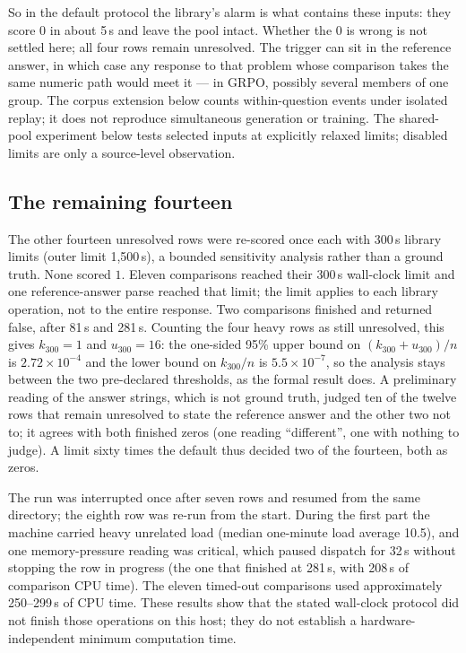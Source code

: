\documentclass[10pt,a4paper]{article}
\begin{document}
So in the default protocol the library's alarm is what contains these
inputs: they score $0$ in about 5\,s and leave the pool intact. Whether the
0 is wrong is not settled here; all four rows remain unresolved. The trigger can sit in the reference answer, in which case any
response to that problem whose comparison takes the same numeric path would
meet it --- in GRPO, possibly several members of one group. The corpus
extension below counts within-question events under isolated replay; it does
not reproduce simultaneous generation or training. The shared-pool experiment
below tests selected inputs at explicitly relaxed limits; disabled limits
are only a source-level observation.

\subsection{The remaining fourteen}
The other fourteen unresolved rows were re-scored once each with 300\,s
library limits (outer limit 1,500\,s), a bounded sensitivity analysis rather
than a ground truth. None scored $1$. Eleven comparisons reached their
300\,s wall-clock limit and one reference-answer parse reached that limit;
the limit applies to each library operation, not to the entire response.
Two comparisons
finished and returned false, after 81\,s and 281\,s. Counting the four heavy
rows as still unresolved, this gives $k_{300}=1$ and $u_{300}=16$: the one-sided
95\% upper bound on $(k_{300}+u_{300})/n$ is $2.72\times10^{-4}$ and the
lower bound on $k_{300}/n$ is $5.5\times10^{-7}$, so the analysis stays between
the two pre-declared thresholds, as the formal result does. A preliminary
reading of the answer strings, which is not ground truth, judged ten of the twelve rows that
remain unresolved to state the reference answer and the other two not to; it
agrees with both finished zeros (one reading ``different'', one with nothing
to judge). A limit sixty times the default thus decided two of the fourteen,
both as zeros.

The run was interrupted once after seven rows and resumed
from the same directory; the eighth row was re-run from the start. During the
first part the machine carried heavy unrelated load (median one-minute load
average 10.5), and one memory-pressure reading was critical, which paused
dispatch for 32\,s without stopping the row in progress (the one that
finished at 281\,s, with 208\,s of comparison CPU time). The eleven
timed-out comparisons used approximately 250--299\,s of CPU time. These
results show that the stated wall-clock protocol did not finish those
operations on this host; they do not establish a hardware-independent
minimum computation time.
\end{document}
